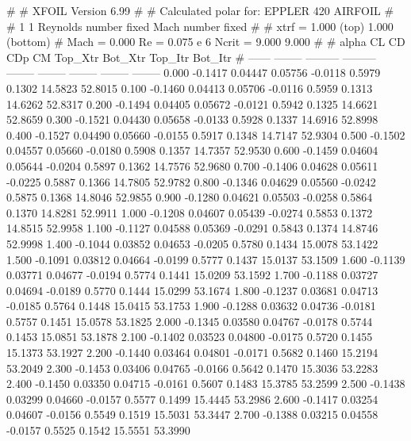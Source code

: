 #  
#       XFOIL         Version 6.99
#  
# Calculated polar for: EPPLER 420 AIRFOIL                              
#  
# 1 1 Reynolds number fixed          Mach number fixed         
#  
# xtrf =   1.000 (top)        1.000 (bottom)  
# Mach =   0.000     Re =     0.075 e 6     Ncrit =   9.000  9.000
#  
#   alpha    CL        CD       CDp       CM     Top_Xtr  Bot_Xtr  Top_Itr  Bot_Itr
#  ------ -------- --------- --------- -------- -------- -------- -------- --------
   0.000  -0.1417   0.04447   0.05756  -0.0118   0.5979   0.1302  14.5823  52.8015
   0.100  -0.1460   0.04413   0.05706  -0.0116   0.5959   0.1313  14.6262  52.8317
   0.200  -0.1494   0.04405   0.05672  -0.0121   0.5942   0.1325  14.6621  52.8659
   0.300  -0.1521   0.04430   0.05658  -0.0133   0.5928   0.1337  14.6916  52.8998
   0.400  -0.1527   0.04490   0.05660  -0.0155   0.5917   0.1348  14.7147  52.9304
   0.500  -0.1502   0.04557   0.05660  -0.0180   0.5908   0.1357  14.7357  52.9530
   0.600  -0.1459   0.04604   0.05644  -0.0204   0.5897   0.1362  14.7576  52.9680
   0.700  -0.1406   0.04628   0.05611  -0.0225   0.5887   0.1366  14.7805  52.9782
   0.800  -0.1346   0.04629   0.05560  -0.0242   0.5875   0.1368  14.8046  52.9855
   0.900  -0.1280   0.04621   0.05503  -0.0258   0.5864   0.1370  14.8281  52.9911
   1.000  -0.1208   0.04607   0.05439  -0.0274   0.5853   0.1372  14.8515  52.9958
   1.100  -0.1127   0.04588   0.05369  -0.0291   0.5843   0.1374  14.8746  52.9998
   1.400  -0.1044   0.03852   0.04653  -0.0205   0.5780   0.1434  15.0078  53.1422
   1.500  -0.1091   0.03812   0.04664  -0.0199   0.5777   0.1437  15.0137  53.1509
   1.600  -0.1139   0.03771   0.04677  -0.0194   0.5774   0.1441  15.0209  53.1592
   1.700  -0.1188   0.03727   0.04694  -0.0189   0.5770   0.1444  15.0299  53.1674
   1.800  -0.1237   0.03681   0.04713  -0.0185   0.5764   0.1448  15.0415  53.1753
   1.900  -0.1288   0.03632   0.04736  -0.0181   0.5757   0.1451  15.0578  53.1825
   2.000  -0.1345   0.03580   0.04767  -0.0178   0.5744   0.1453  15.0851  53.1878
   2.100  -0.1402   0.03523   0.04800  -0.0175   0.5720   0.1455  15.1373  53.1927
   2.200  -0.1440   0.03464   0.04801  -0.0171   0.5682   0.1460  15.2194  53.2049
   2.300  -0.1453   0.03406   0.04765  -0.0166   0.5642   0.1470  15.3036  53.2283
   2.400  -0.1450   0.03350   0.04715  -0.0161   0.5607   0.1483  15.3785  53.2599
   2.500  -0.1438   0.03299   0.04660  -0.0157   0.5577   0.1499  15.4445  53.2986
   2.600  -0.1417   0.03254   0.04607  -0.0156   0.5549   0.1519  15.5031  53.3447
   2.700  -0.1388   0.03215   0.04558  -0.0157   0.5525   0.1542  15.5551  53.3990

